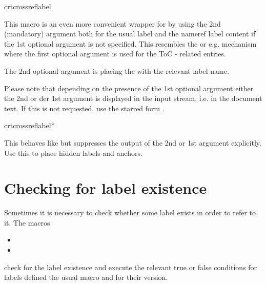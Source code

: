 \documentclass[12pt,a4paper,oneside]{article}
\makeatletter
\newcommand{\chdocextractversion}[1]{%
  \@nameuse{#1}%
}
\makeatother
\begin{document}
\begin{docCommand}[doc new={\chdocextractversion{crossreftoolsversion0.4}}]{crtcrossreflabel}{}

This macro is an even more convenient wrapper for  by using the 2nd (mandatory) argument both for the usual label and the nameref label content if the 1st optional argument is not specified. This resembles the  or e.g.  mechanism where the first optional argument is used for the ToC - related entries. 

The 2nd optional argument is placing the  with the relevant label name. 

\begin{marker}
  Please note that depending on the presence of the 1st optional argument either the 2nd or der 1st argument is displayed in the input stream, i.e. in the document text. If this is not requested, use the starred form .
\end{marker}


\end{docCommand}

\begin{docCommand}[doc new={\chdocextractversion{crossreftoolsversion0.4}}]{crtcrossreflabel*}{}

This behaves like  but suppresses the output of the 2nd or 1st argument explicitly. Use this to place hidden labels and anchors. 
\end{docCommand}


\clearpage
\section{Checking for label existence}\label{sec:checkinglabelexistence}

Sometimes it is necessary to check whether some label exists in order to refer to it. The macros 

\begin{itemize}
  \item {}
  \item {}
\end{itemize}

check for the label existence and execute the relevant true or false conditions for labels defined the usual  macro and for their  version. 
\end{document}
